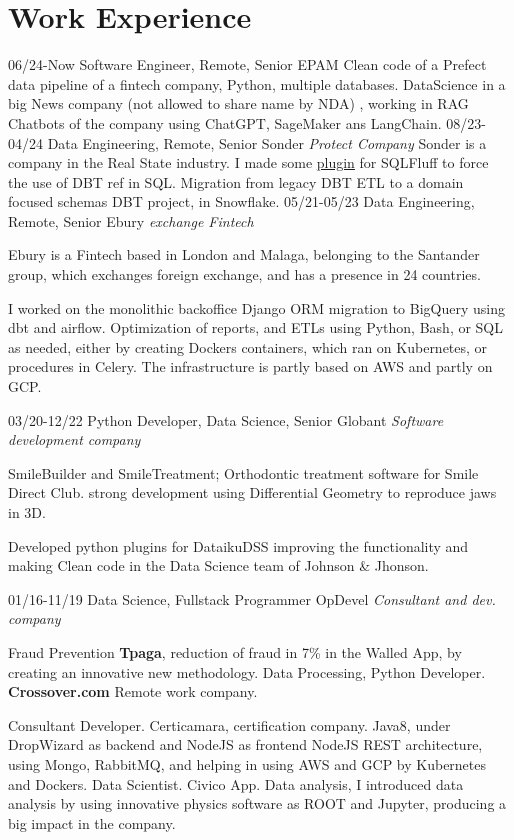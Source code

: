 \section{Work Experience}

\begin{entrylist}
  \entry
    {06/24-Now}
    {Software Engineer, Remote, Senior}
    {EPAM}
    {Clean code of a Prefect data pipeline of a fintech company, Python, multiple databases. DataScience in a big News company (not allowed to share name by NDA) , working in RAG Chatbots of the company using ChatGPT, SageMaker ans LangChain.}
  \entry
    {08/23-04/24}
    {Data Engineering, Remote, Senior}
    {Sonder {\sl Protect Company}}
	{Sonder is a company in the Real State industry. I made some \href{http:\\https://github.com/juanfejara/sqlfluff-templ-check}{plugin} for SQLFluff to
     force the use of DBT ref in SQL. Migration from legacy DBT ETL to a domain focused schemas DBT project, in Snowflake.}
  \entry
    {05/21-05/23}
    {Data Engineering, Remote, Senior}
    {Ebury {\sl exchange Fintech}}
    {Ebury is a Fintech based in London and Malaga, belonging to the Santander group, which exchanges
foreign exchange, and has a presence in 24 countries.

I worked on the monolithic backoffice Django ORM migration to BigQuery using dbt and airflow. Optimization of reports, and ETLs using Python, Bash, or SQL as needed, either by creating Dockers containers, which ran on Kubernetes, or procedures in Celery.
The infrastructure is partly based on AWS and partly on GCP.}
  \entry
    {03/20-12/22}
    {Python Developer, Data Science, Senior}
    {Globant {\sl Software development company}}
    {SmileBuilder and SmileTreatment; Orthodontic treatment software for Smile Direct Club. strong development using Differential Geometry to reproduce jaws in 3D.

Developed python plugins for DataikuDSS improving the functionality and making Clean code in the Data Science team of Johnson \& Jhonson.}

  \entry
    {01/16-11/19}
    {Data Science, Fullstack Programmer}
    {OpDevel {\sl Consultant and dev. company}}
    {Fraud Prevention \textbf{Tpaga}, reduction of fraud in 7\% in the Walled App, by creating an innovative new methodology. Data Processing, Python Developer. \textbf{Crossover.com} Remote work company.

Consultant Developer. Certicamara, certification company. Java8, under DropWizard as backend and NodeJS as frontend NodeJS REST architecture, using Mongo, RabbitMQ, and helping in using AWS and GCP by Kubernetes and Dockers. Data Scientist. Civico App. Data analysis, I introduced data analysis by using innovative physics software as ROOT and Jupyter, producing a big impact in
the company.

}
\end{entrylist}
